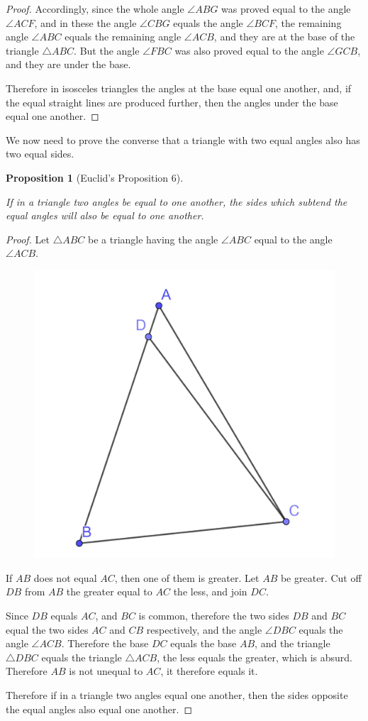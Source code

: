 \documentclass[
]{book}
\newtheorem{proposition}{Proposition}[chapter]
\theoremstyle{definition}
\theoremstyle{definition}
\theoremstyle{definition}
\theoremstyle{definition}
\theoremstyle{remark}
\begin{document}
\begin{proof}
Accordingly, since the whole angle \(\angle ABG\) was proved equal to the angle \(\angle ACF\), and in these the angle \(\angle CBG\) equals the angle \(\angle BCF\), the remaining angle \(\angle ABC\) equals the remaining angle \(\angle ACB\), and they are at the base of the triangle \(\triangle ABC\). But the angle \(\angle FBC\) was also proved equal to the angle \(\angle GCB\), and they are under the base.

Therefore in isosceles triangles the angles at the base equal one another, and, if the equal straight lines are produced further, then the angles under the base equal one another.

\end{proof}

We now need to prove the converse that a triangle with two equal angles also has two equal sides.

\begin{proposition}[Euclid's Proposition 6]
\protect\hypertarget{prp:prop6}{}\label{prp:prop6}

If in a triangle two angles be equal to one another, the sides which subtend the equal angles will also be equal to one another.

\end{proposition}

\begin{proof}

Let \(\triangle ABC\) be a triangle having the angle \(\angle ABC\) equal to the angle \(\angle ACB\).

\begin{figure}

{\centering \includegraphics[width=0.3\linewidth]{images/Prop6} 

}

\end{figure}

If \(AB\) does not equal \(AC\), then one of them is greater. Let \(AB\) be greater. Cut off \(DB\) from \(AB\) the greater equal to \(AC\) the less, and join \(DC\).

Since \(DB\) equals \(AC\), and \(BC\) is common, therefore the two sides \(DB\) and \(BC\) equal the two sides \(AC\) and \(CB\) respectively, and the angle \(\angle DBC\) equals the angle \(\angle ACB\). Therefore the base \(DC\) equals the base \(AB\), and the triangle \(\triangle DBC\) equals the triangle \(\triangle ACB\), the less equals the greater, which is absurd. Therefore \(AB\) is not unequal to \(AC\), it therefore equals it.

Therefore if in a triangle two angles equal one another, then the sides opposite the equal angles also equal one another.

\end{proof}
\end{document}
